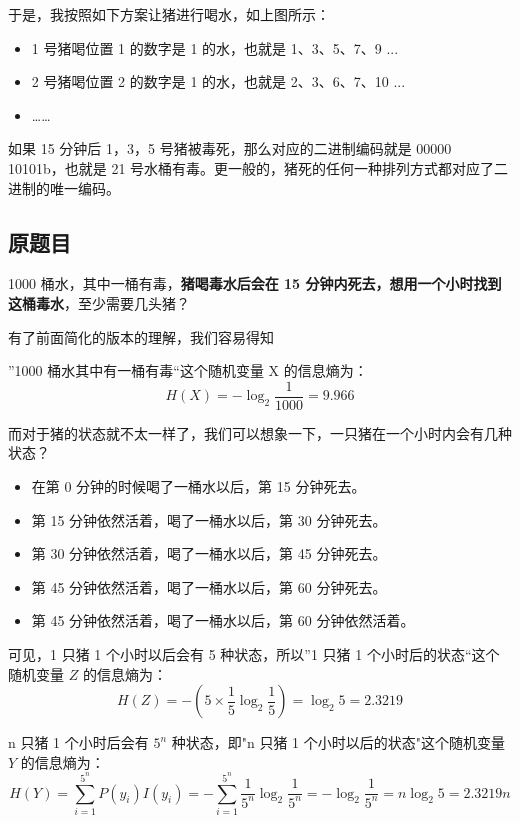 \documentclass[12pt]{article}
\begin{document}
于是，我按照如下方案让猪进行喝水，如上图所示：

\begin{itemize}[itemindent=2em]
    \item 1 号猪喝位置 1 的数字是 1 的水，也就是 1、3、5、7、9 ...
    
    \item 2 号猪喝位置 2 的数字是 1 的水，也就是 2、3、6、7、10 ...
    
    \item ……
\end{itemize}

如果 15 分钟后 1，3，5 号猪被毒死，那么对应的二进制编码就是 00000 10101b，也就是 21 号水桶有毒。更一般的，猪死的任何一种排列方式都对应了二进制的唯一编码。

\subsection{原题目}
1000 桶水，其中一桶有毒，\textbf{猪喝毒水后会在 15 分钟内死去，想用一个小时找到这桶毒水}，至少需要几头猪？

有了前面简化的版本的理解，我们容易得知

”1000 桶水其中有一桶有毒“这个随机变量 X 的信息熵为：
$$H(X)=-\log_2{\frac{1}{1000}} = 9.966$$

而对于猪的状态就不太一样了，我们可以想象一下，一只猪在一个小时内会有几种状态？
\begin{itemize}[itemindent=2em]
    \item 在第 0 分钟的时候喝了一桶水以后，第 15 分钟死去。
    
    \item 第 15 分钟依然活着，喝了一桶水以后，第 30 分钟死去。
    
    \item 第 30 分钟依然活着，喝了一桶水以后，第 45 分钟死去。
    
    \item 第 45 分钟依然活着，喝了一桶水以后，第 60 分钟死去。
    
    \item 第 45 分钟依然活着，喝了一桶水以后，第 60 分钟依然活着。
\end{itemize}

可见，1 只猪 1 个小时以后会有 5 种状态，所以”1 只猪 1 个小时后的状态“这个随机变量 $Z$ 的信息熵为：
$$H(Z) = -(5\times\frac{1}{5}\log_2{\frac{1}{5}}) = \log_2{5} = 2.3219$$

n 只猪 1 个小时后会有 $5^n$ 种状态，即"n 只猪 1 个小时以后的状态"这个随机变量 $Y$ 的信息熵为：
$$H(Y) = \sum_{i=1}^{5^n}P(y_i)I(y_i)=-\sum_{i=1}^{5^n}\frac{1}{5^n}\log_2{\frac{1}{5^n}} = -\log_2{\frac{1}{5^n}} = n\log_2{5} = 2.3219n$$
\end{document}
